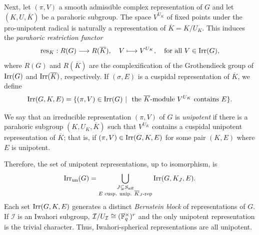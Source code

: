 Next, let $(\pi,V)$ a smooth admissible complex representation of $G$ and let $(K,U,\overline{K})$ be a parahoric subgroup. The space $V^{U_K}$ of fixed points under the pro-unipotent radical is naturally a representation of $\overline{K}=K/U_K$. This induces the \textit{parahoric restriction functor}
\begin{equation}\label{eqn:par_restriction}
    \mathrm{res}_K:R(G)\longrightarrow R(\overline{K}),\quad V\longmapsto V^{U_K},\quad\text{for all }V\in\mathrm{Irr}(G),
\end{equation}
where $R(G)$ and $R(\overline{K})$ are the complexification of the Grothendieck group of $\mathrm{Irr}(G)$ and $\mathrm{Irr}(\overline{K})$, respectively. If $(\sigma,E)$ is a cuspidal representation of $\overline{K}$, we define
$$\Irr(G,K,E)=\{(\pi,V)\in\Irr(G)\ |\ \text{ the }\overline{K}\text{-module $V^{U_K}$ contains }E\}.$$
\begin{definition}
    We say that an irreducible representation $(\pi,V)$ of $G$ is \textit{unipotent} if there is a parahoric subgroup $(K,U_K,\overline{K})$ such that $V^{U_K}$ contains a cuspidal unipotent representation of $\overline{K}$; that is, if $(\pi,V)\in\mathrm{Irr}(G,K,E)$ for some pair $(K,E)$ where $E$ is unipotent.
\end{definition}
Therefore, the set of unipotent representations, up to isomorphism, is
$$\mathrm{Irr}_{\mathrm{un}}(G)=\bigcup_{\substack{J\subsetneq S_{\mathrm{aff}}\\ E \text{ cusp. unip. $\overline{K}_J$-rep}}}\mathrm{Irr}(G,K_J,E).$$
Each set $\mathrm{Irr}(G,K,E)$ generates a distinct \textit{Bernstein block} of representations of $G$. If $\mathcal{I}$ is an Iwahori subgroup, $\mathcal{I}/U_\mathcal{I}\cong(\mathbb{F}_q^\times)^r$ and the only unipotent representation is the trivial character. Thus, Iwahori-spherical representations are all unipotent. 

